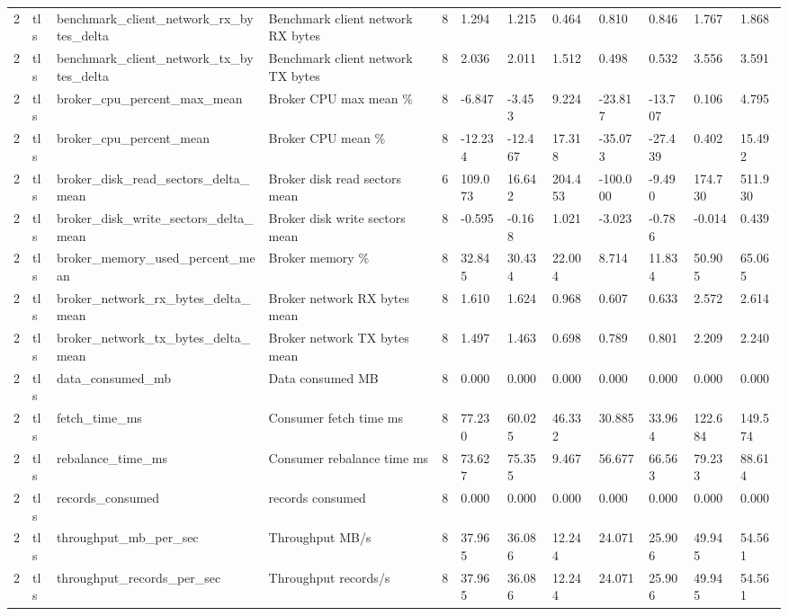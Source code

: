 \begin{longtable}{llllllllllll}
2 & tls & benchmark\_client\_network\_rx\_bytes\_delta & Benchmark client network RX bytes & 8 & 1.294 & 1.215 & 0.464 & 0.810 & 0.846 & 1.767 & 1.868 \\
2 & tls & benchmark\_client\_network\_tx\_bytes\_delta & Benchmark client network TX bytes & 8 & 2.036 & 2.011 & 1.512 & 0.498 & 0.532 & 3.556 & 3.591 \\
2 & tls & broker\_cpu\_percent\_max\_mean & Broker CPU max mean \% & 8 & -6.847 & -3.453 & 9.224 & -23.817 & -13.707 & 0.106 & 4.795 \\
2 & tls & broker\_cpu\_percent\_mean & Broker CPU mean \% & 8 & -12.234 & -12.467 & 17.318 & -35.073 & -27.439 & 0.402 & 15.492 \\
2 & tls & broker\_disk\_read\_sectors\_delta\_mean & Broker disk read sectors mean & 6 & 109.073 & 16.642 & 204.453 & -100.000 & -9.490 & 174.730 & 511.930 \\
2 & tls & broker\_disk\_write\_sectors\_delta\_mean & Broker disk write sectors mean & 8 & -0.595 & -0.168 & 1.021 & -3.023 & -0.786 & -0.014 & 0.439 \\
2 & tls & broker\_memory\_used\_percent\_mean & Broker memory \% & 8 & 32.845 & 30.434 & 22.004 & 8.714 & 11.834 & 50.905 & 65.065 \\
2 & tls & broker\_network\_rx\_bytes\_delta\_mean & Broker network RX bytes mean & 8 & 1.610 & 1.624 & 0.968 & 0.607 & 0.633 & 2.572 & 2.614 \\
2 & tls & broker\_network\_tx\_bytes\_delta\_mean & Broker network TX bytes mean & 8 & 1.497 & 1.463 & 0.698 & 0.789 & 0.801 & 2.209 & 2.240 \\
2 & tls & data\_consumed\_mb & Data consumed MB & 8 & 0.000 & 0.000 & 0.000 & 0.000 & 0.000 & 0.000 & 0.000 \\
2 & tls & fetch\_time\_ms & Consumer fetch time ms & 8 & 77.230 & 60.025 & 46.332 & 30.885 & 33.964 & 122.684 & 149.574 \\
2 & tls & rebalance\_time\_ms & Consumer rebalance time ms & 8 & 73.627 & 75.355 & 9.467 & 56.677 & 66.563 & 79.233 & 88.614 \\
2 & tls & records\_consumed & records consumed & 8 & 0.000 & 0.000 & 0.000 & 0.000 & 0.000 & 0.000 & 0.000 \\
2 & tls & throughput\_mb\_per\_sec & Throughput MB/s & 8 & 37.965 & 36.086 & 12.244 & 24.071 & 25.906 & 49.945 & 54.561 \\
2 & tls & throughput\_records\_per\_sec & Throughput records/s & 8 & 37.965 & 36.086 & 12.244 & 24.071 & 25.906 & 49.945 & 54.561 \\

\end{longtable}
